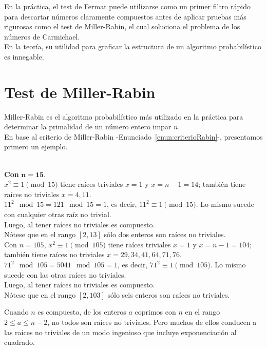 En la práctica, el test de Fermat puede utilizarse como un primer filtro rápido para descartar números claramente compuestos antes de aplicar pruebas más rigurosas como el test de Miller-Rabin, el cual soluciona el problema de los números de Carmichael. \\
En la teoría, su utilidad para graficar la estructura de un algoritmo probabilístico es innegable.

\section{Test de Miller-Rabin}
Miller-Rabin es el algoritmo probabilístico más utilizado en la práctica para determinar la primalidad de un número entero impar $n$. \\

En base al criterio de Miller-Rabin -Enunciado~\ref{enun:criterioRabin}-, presentamos primero un ejemplo.

\begin{ejemplo} \, \\
\textbf{Con} $\boldsymbol{n=15}$. \\
$x^2 \equiv 1 \pmod {15}$ tiene raíces triviales $x=1$ y $x=n-1=14$; también tiene raíces no triviales $x=4,11$. \\
$11^2 \mod 15 = 121 \mod 15 = 1$, es decir, $11^2 \equiv 1 \pmod {15}$. Lo mismo sucede con cualquier otras raíz no trivial. \\
Luego, al tener raíces no triviales es compuesto. \\
Nótese que en el rango $[2,13]$ sólo dos enteros son raíces no triviales. \\
Con $n=105$, $x^2 \equiv 1 \pmod {105}$ tiene raíces triviales $x=1$ y $x=n-1=104$; también tiene raíces no triviales $x=29,34,41,64,71,76$. \\
$71^2 \mod 105 = 5041 \mod 105 = 1$, es decir, $71^2 \equiv 1 \pmod {105}$. Lo mismo sucede con las otras raíces no triviales. \\
Luego, al tener raíces no triviales es compuesto. \\
Nótese que en el rango $[2,103]$ sólo seis enteros son raíces no triviales.
\end{ejemplo}

Cuando $n$ es compuesto, de los enteros $a$ coprimos con $n$ en el rango $2 \leq a \leq n-2$, no todos son raíces no triviales. 
Pero muchos de ellos conducen a las raíces no triviales de un modo ingenioso que incluye exponenciación al cuadrado.

